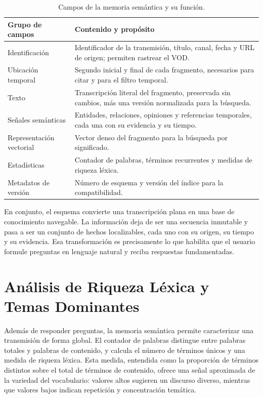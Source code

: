 \documentclass[12pt,a4paper]{article}
\begin{document}
\begin{table}[h]
\centering
\small
\begin{tabular}{@{}p{4.2cm}p{9.8cm}@{}}
\toprule
\textbf{Grupo de campos} & \textbf{Contenido y propósito} \\
\midrule
Identificación & Identificador de la transmisión, título, canal, fecha y URL de origen; permiten rastrear el VOD. \\
Ubicación temporal & Segundo inicial y final de cada fragmento, necesarios para citar y para el filtro temporal. \\
Texto & Transcripción literal del fragmento, preservada sin cambios, más una versión normalizada para la búsqueda. \\
Señales semánticas & Entidades, relaciones, opiniones y referencias temporales, cada una con su evidencia y su tiempo. \\
Representación vectorial & Vector denso del fragmento para la búsqueda por significado. \\
Estadísticas & Contador de palabras, términos recurrentes y medidas de riqueza léxica. \\
Metadatos de versión & Número de esquema y versión del índice para la compatibilidad. \\
\bottomrule
\end{tabular}
\caption{Campos de la memoria semántica y su función.}
\label{tab:esquema}
\end{table}

En conjunto, el esquema convierte una transcripción plana en una base de conocimiento navegable. La información deja de ser una secuencia inmutable y pasa a ser un conjunto de hechos localizables, cada uno con su origen, su tiempo y su evidencia. Esa transformación es precisamente lo que habilita que el usuario formule preguntas en lenguaje natural y reciba respuestas fundamentadas.



\section{Análisis de Riqueza Léxica y Temas Dominantes}
\label{sec:riqueza}

Además de responder preguntas, la memoria semántica permite caracterizar una transmisión de forma global. El contador de palabras distingue entre palabras totales y palabras de contenido, y calcula el número de términos únicos y una medida de riqueza léxica. Esta medida, entendida como la proporción de términos distintos sobre el total de términos de contenido, ofrece una señal aproximada de la variedad del vocabulario: valores altos sugieren un discurso diverso, mientras que valores bajos indican repetición y concentración temática.
\end{document}
